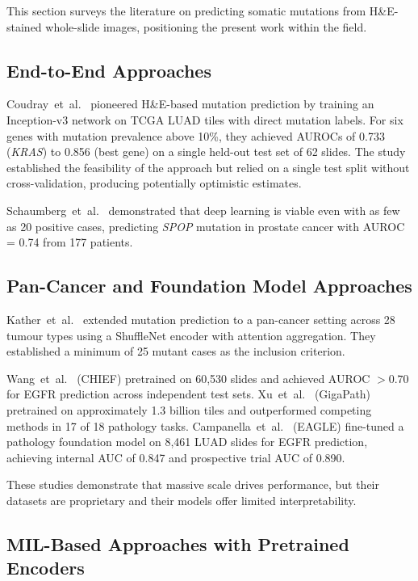 This section surveys the literature on predicting somatic mutations from H\&E-stained whole-slide images, positioning the present work within the field.

\subsection{End-to-End Approaches}
\label{sec:bg:related:e2e}

Coudray~et~al.~\cite{coudray2018classification} pioneered H\&E-based mutation prediction by training an Inception-v3 network on TCGA LUAD tiles with direct mutation labels.
For six genes with mutation prevalence above 10\%, they achieved AUROCs of 0.733 (\textit{KRAS}) to 0.856 (best gene) on a single held-out test set of 62 slides.
The study established the feasibility of the approach but relied on a single test split without cross-validation, producing potentially optimistic estimates.

Schaumberg~et~al.~\cite{schaumberg2018deep} demonstrated that deep learning is viable even with as few as 20 positive cases, predicting \textit{SPOP} mutation in prostate cancer with AUROC = 0.74 from 177 patients.

\subsection{Pan-Cancer and Foundation Model Approaches}
\label{sec:bg:related:pancancer}

Kather~et~al.~\cite{kather2020pancancer} extended mutation prediction to a pan-cancer setting across 28 tumour types using a ShuffleNet encoder with attention aggregation.
They established a minimum of 25 mutant cases as the inclusion criterion.

Wang~et~al.~\cite{wang2024chief} (CHIEF) pretrained on 60,530 slides and achieved AUROC $> 0.70$ for EGFR prediction across independent test sets.
Xu~et~al.~\cite{xu2024gigapath} (GigaPath) pretrained on approximately 1.3 billion tiles and outperformed competing methods in 17 of 18 pathology tasks.
Campanella~et~al.~\cite{campanella2025eagle} (EAGLE) fine-tuned a pathology foundation model on 8,461 LUAD slides for EGFR prediction, achieving internal AUC of 0.847 and prospective trial AUC of 0.890.

These studies demonstrate that massive scale drives performance, but their datasets are proprietary and their models offer limited interpretability.

\subsection{MIL-Based Approaches with Pretrained Encoders}
\label{sec:bg:related:mil}

